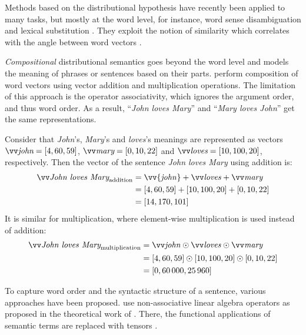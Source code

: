 Methods based on the distributional hypothesis have recently been applied to many tasks, but mostly at the word level, for instance, word sense disambiguation \cite{ZhitomirskyGeffet2009} and lexical substitution \cite{Thater:2010:CSR:1858681.1858778}. They exploit the notion of similarity which correlates with the angle between word vectors \cite{Turney:2010:FMV:1861751.1861756}.

\emph{Compositional} distributional semantics goes beyond the word level and models the meaning of phrases or sentences based on their parts.  perform composition of word vectors using vector addition and multiplication operations. The limitation of this approach is the operator associativity, which ignores the argument order, and thus word order. As a result, ``\textit{John loves Mary}'' and ``\textit{Mary loves John}'' get the same representations.

Consider that \textit{John}'s, \textit{Mary}'s and \textit{loves}'s meanings are represented as vectors $\ov{\text{\it john}} = [4, 60, 59]$, $\ov{\text{\it mary}} = [0, 10, 22]$ and $\ov{\text{\it loves}} = [10, 100, 20]$, respectively. Then the vector of the sentence \textit{John loves Mary} using addition is:
%
\begin{align*}
  \ov{\text{\it John loves Mary}}_{\text{addition}} &= \vv{\mathit{john}} + \ov{\mathit{loves}} + \ov{\mathit{mary}} \\
                                  &= [4, 60, 59] + [10, 100, 20] + [0, 10, 22] \\
                                  &= [14, 170, 101]
\end{align*}
%
It is similar for multiplication, where element-wise multiplication is used instead of addition:
%
\begin{align*}
  \ov{\text{\it John loves Mary}}_{\text{multiplication}} &= \ov{\mathit{john}} \odot \ov{\mathit{loves}} \odot \ov{\mathit{mary}} \\
                                  &= [4, 60, 59] \odot [10, 100, 20] \odot [0, 10, 22] \\
                                  &= [0, 60\,000, 25\,960]
\end{align*}

To capture word order and the syntactic structure of a sentence, various approaches have been proposed.  use non-associative linear algebra operators as proposed in the theoretical work of . There, the functional applications of semantic terms are replaced with tensors \cite{Bourbaki1998commutative}.

